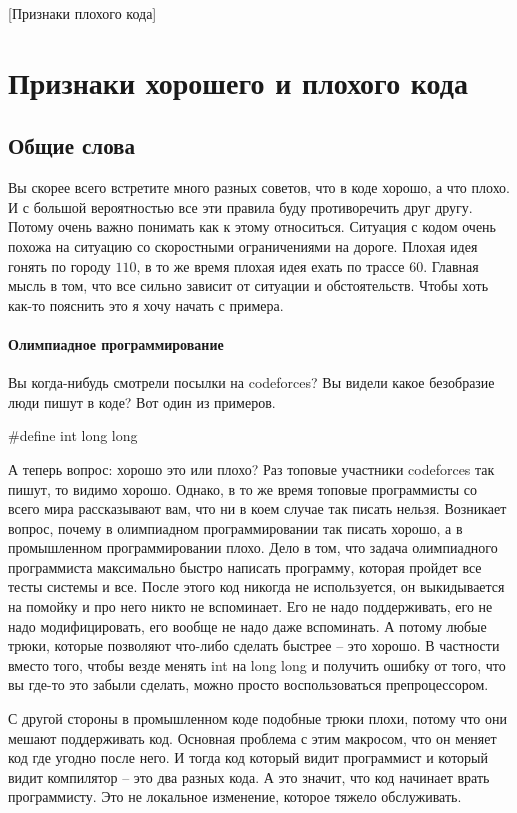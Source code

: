 [Признаки плохого кода]


\section{Признаки хорошего и плохого кода}

\subsection{Общие слова}

Вы скорее всего встретите много разных советов, что в коде хорошо, а что плохо.
И с большой вероятностью все эти правила буду противоречить друг другу.
Потому очень важно понимать как к этому относиться.
Ситуация с кодом очень похожа на ситуацию со скоростными ограничениями на дороге.
Плохая идея гонять по городу $110$, в то же время плохая идея ехать по трассе $60$.
Главная мысль в том, что все сильно зависит от ситуации и обстоятельств.
Чтобы хоть как-то пояснить это я хочу начать с примера.

\paragraph{Олимпиадное программирование}

Вы когда-нибудь смотрели посылки на codeforces?
Вы видели какое безобразие люди пишут в коде?
Вот один из примеров.
\begin{cppcode}
#define int long long
\end{cppcode}
А теперь вопрос: хорошо это или плохо?
Раз топовые участники codeforces так пишут, то видимо хорошо.
Однако, в то же время топовые программисты со всего мира рассказывают вам, что ни в коем случае так писать нельзя.
Возникает вопрос, почему в олимпиадном программировании так писать хорошо, а в промышленном программировании плохо.
Дело в том, что задача олимпиадного программиста максимально быстро написать программу, которая пройдет все тесты системы и все.
После этого код никогда не используется, он выкидывается на помойку и про него никто не вспоминает.
Его не надо поддерживать, его не надо модифицировать, его вообще не надо даже вспоминать.
А потому любые трюки, которые позволяют что-либо сделать быстрее -- это хорошо.
В частности вместо того, чтобы везде менять int на long long и получить ошибку от того, что вы где-то это забыли сделать, можно просто воспользоваться препроцессором.

С другой стороны в промышленном коде подобные трюки плохи, потому что они мешают поддерживать код.
Основная проблема с этим макросом, что он меняет код где угодно после него.
И тогда код который видит программист и который видит компилятор -- это два разных кода.
А это значит, что код начинает врать программисту.
Это не локальное изменение, которое тяжело обслуживать.

